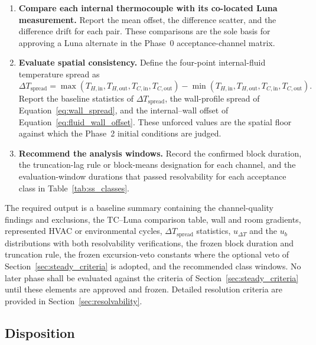 \documentclass[11pt]{article}
\begin{document}
\begin{enumerate}
    \item \textbf{Compare each internal thermocouple with its co-located Luna measurement.} Report the mean offset, the difference scatter, and the difference drift for each pair. These comparisons are the sole basis for approving a Luna alternate in the Phase~0 acceptance-channel matrix.

    \item \textbf{Evaluate spatial consistency.} Define the four-point internal-fluid temperature spread as
    \begin{equation}
        \Delta T_{\mathrm{spread}}
        =
        \max\left(
            T_{H,\mathrm{in}},
            T_{H,\mathrm{out}},
            T_{C,\mathrm{in}},
            T_{C,\mathrm{out}}
        \right)
        -
        \min\left(
            T_{H,\mathrm{in}},
            T_{H,\mathrm{out}},
            T_{C,\mathrm{in}},
            T_{C,\mathrm{out}}
        \right).
        \label{eq:four_point_spread}
    \end{equation}
    Report the baseline statistics of $\Delta T_{\mathrm{spread}}$, the wall-profile spread of Equation~\eqref{eq:wall_spread}, and the internal--wall offset of Equation~\eqref{eq:fluid_wall_offset}. These unforced values are the spatial floor against which the Phase~2 initial conditions are judged.

    \item \textbf{Recommend the analysis windows.} Record the confirmed block duration, the truncation-lag rule or block-means designation for each channel, and the evaluation-window durations that passed resolvability for each acceptance class in Table~\ref{tab:ss_classes}.
\end{enumerate}

The required output is a baseline summary containing the channel-quality findings and exclusions, the TC--Luna comparison table, wall and room gradients, represented HVAC or environmental cycles, $\Delta T_{\mathrm{spread}}$ statistics, $u_{\Delta T}$ and the $u_b$ distributions with both resolvability verifications, the frozen block duration and truncation rule, the frozen excursion-veto constants where the optional veto of Section~\ref{sec:steady_criteria} is adopted, and the recommended class windows. No later phase shall be evaluated against the criteria of Section~\ref{sec:steady_criteria} until these elements are approved and frozen. Detailed resolution criteria are provided in Section~\ref{sec:resolvability}.


\subsection{Disposition}
\end{document}
